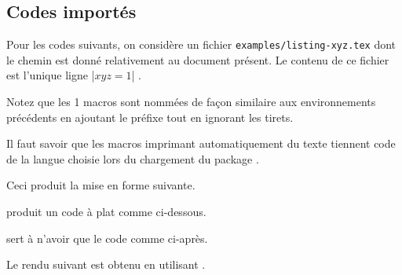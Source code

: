 \documentclass[12pt,a4paper]{article}
\begin{document}

\subsection{Codes importés}

Pour les codes suivants, on considère un fichier \verb+examples/listing-xyz.tex+ dont le chemin est donné relativement au document présent.
Le contenu de ce fichier est l'unique ligne \docilatex|$x y z = 1$| .

\medskip

Notez que les 1\ieres{} macros sont nommées de façon similaire aux environnements précédents en ajoutant le préfixe  tout en ignorant les tirets.


\begin{docrem}
    Il faut savoir que les macros imprimant automatiquement du texte tiennent code de la langue choisie lors du chargement du package .
\end{docrem}





\begin{doclatex-alone}
\end{doclatex-alone}

Ceci produit la mise en forme suivante.





\docexa[À la suite]

 produit un code à plat comme ci-dessous.







 sert à n'avoir que le code comme ci-après.




{}

Le rendu suivant est obtenu en utilisant .
\end{document}

